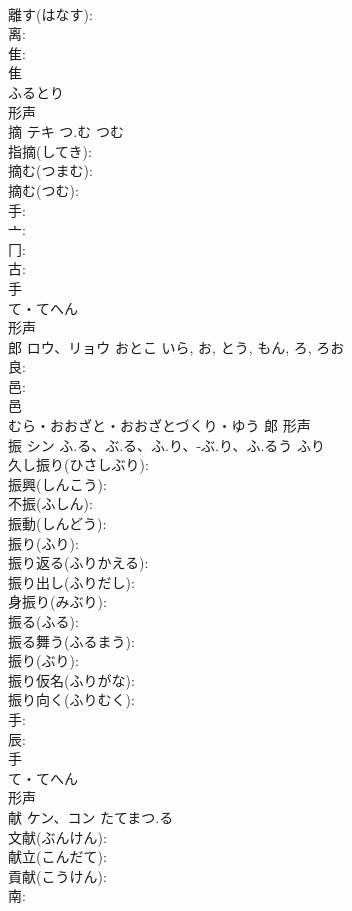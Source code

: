 \documentclass[8pt]{extreport}
\begin{document}
\begin{CJK}{UTF8}{min}
\\	離す(はなす): 
\\	离: 
\\	隹: 
\\	隹	
\\	ふるとり	
\\	形声 
\\	摘	テキ	つ.む	つむ	
\\	指摘(してき): 
\\	摘む(つまむ): 
\\	摘む(つむ): 
\\	手: 
\\	亠: 
\\	冂: 
\\	古: 
\\	手	
\\	て・てへん	
\\	形声 
\\	郎	ロウ、リョウ	おとこ	いら, お, とう, もん, ろ, ろお	
\\	良: 
\\	邑: 
\\	邑	
\\	むら・おおざと・おおざとづくり・ゆう	郞	形声 
\\	振	シン	ふ.る、ぶ.る、ふ.り、-ぶ.り、ふ.るう	ふり	
\\	久し振り(ひさしぶり): 
\\	振興(しんこう): 
\\	不振(ふしん): 
\\	振動(しんどう): 
\\	振り(ふり): 
\\	振り返る(ふりかえる): 
\\	振り出し(ふりだし): 
\\	身振り(みぶり): 
\\	振る(ふる): 
\\	振る舞う(ふるまう): 
\\	振り(ぶり): 
\\	振り仮名(ふりがな): 
\\	振り向く(ふりむく): 
\\	手: 
\\	辰: 
\\	手	
\\	て・てへん	
\\	形声 
\\	献	ケン、コン	たてまつ.る		
\\	文献(ぶんけん): 
\\	献立(こんだて): 
\\	貢献(こうけん): 
\\	南: 

\end{CJK}
\end{document}
